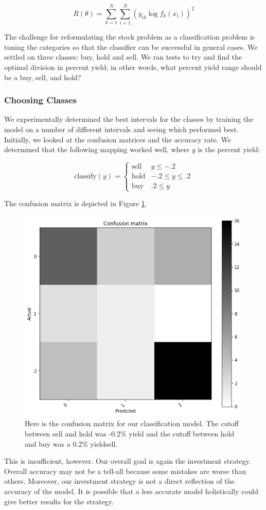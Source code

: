 \documentclass[12pt]{article}
\begin{document}
$$R(\theta) = \sum_{k=1}^{N} \sum_{i=1}^{N} (y_{ik} \log f_k(x_i))^2$$ 

The challenge for reformulating the stock problem as a classification problem is tuning the categories so that the classifier can be successful in general cases. We settled on three classes: buy, hold and sell. We ran tests to try and find the optimal division in percent yield; in other words, what percent yield range should be a buy, sell, and hold?

\subsubsection{Choosing Classes}
We experimentally determined the best intervals for the classes by training the model on a number of different intervals and seeing which performed best. Initially, we looked at the confusion matrices and the accuracy rate. We determined that the following mapping worked well, where $y$ is the percent yield: 

\[ \text{classify}(y) = \begin{cases} 
\text{sell} & y\leq -.2 \\
\text{hold} & -.2\leq y\leq .2 \\
\text{buy} & .2\leq y 
\end{cases}
\]

The confusion matrix is depicted in Figure \ref{confusion}.

\begin{figure}
	\centering
	\includegraphics[width=.5\linewidth]{confusion.png}
	\caption{Here is the confusion matrix for our classification model. The cutoff between sell and hold was -0.2\% yield and the cutoff between hold and buy was a 0.2\% yieldsell.}
	\label{confusion}
\end{figure}



This is insufficient, however. Our overall goal is again the investment strategy. Overall accuracy may not be a tell-all because some mistakes are worse than others. Moreover, our investment strategy is not a direct reflection of the accuracy of the model. It is possible that a less accurate model holistically could give better results for the strategy. 
\end{document}
